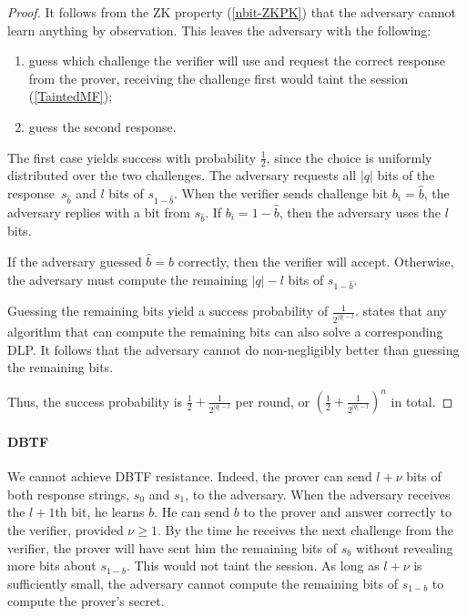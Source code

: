 \begin{proof}
  It follows from the \ac{ZK} property (\cref{nbit-ZKPK}) that the adversary 
  cannot learn anything by observation.
  This leaves the adversary with the following:
  \begin{enumerate}
    \item guess which challenge the verifier will use and request the correct 
      response from the prover, receiving the challenge first would taint the 
      session (\cref{TaintedMF});
    \item guess the second response.
  \end{enumerate}

  The first case yields success with probability \(\frac{1}{2}\), since the 
  choice is uniformly distributed over the two challenges.
  The adversary requests all \(|q|\) bits of the response~\(s_{\hat b}\) and 
  \(l\) bits of \(s_{1-\hat b}\).
  When the verifier sends challenge bit \(b_i = \hat b\), the adversary replies 
  with a bit from \(s_{\hat b}\).
  If \(b_i = 1-\hat b\), then the adversary uses the \(l\) bits.

  If the adversary guessed \(\hat b = b\) correctly, then the verifier will 
  accept.
  Otherwise, the adversary must compute the remaining \(|q|-l\) bits of 
  \(s_{1-\hat b}\).

  Guessing the remaining bits yield a success probability of 
  \(\frac{1}{2^{|q|-l}}\).
   states that any algorithm that can compute the remaining 
  bits can also solve a corresponding \ac{DLP}.
  It follows that the adversary cannot do non-negligibly better than guessing 
  the remaining bits.

  Thus, the success probability is \(\frac{1}{2}+\frac{1}{2^{|q|-l}}\) per 
  round, or \(\left(\frac{1}{2}+\frac{1}{2^{|q|-l}}\right)^n\) in total.
\end{proof}

\paragraph{\Acl{DBTF}}

We cannot achieve \ac{DBTF} resistance.
Indeed, the prover can send \(l+\nu\) bits of both response strings, \(s_0\) 
and \(s_1\), to the adversary.
When the adversary receives the \(l+1\)th bit, he learns \(b\).
He can send \(b\) to the prover and answer correctly to the verifier, provided 
\(\nu \geq 1\).
By the time he receives the next challenge from the verifier, the prover will 
have sent him the remaining bits of \(s_b\) without revealing more bits about 
\(s_{1-b}\).
This would not taint the session.
As long as \(l+\nu\) is sufficiently small, the adversary cannot compute the 
remaining bits of \(s_{1-b}\) to compute the prover's secret.

